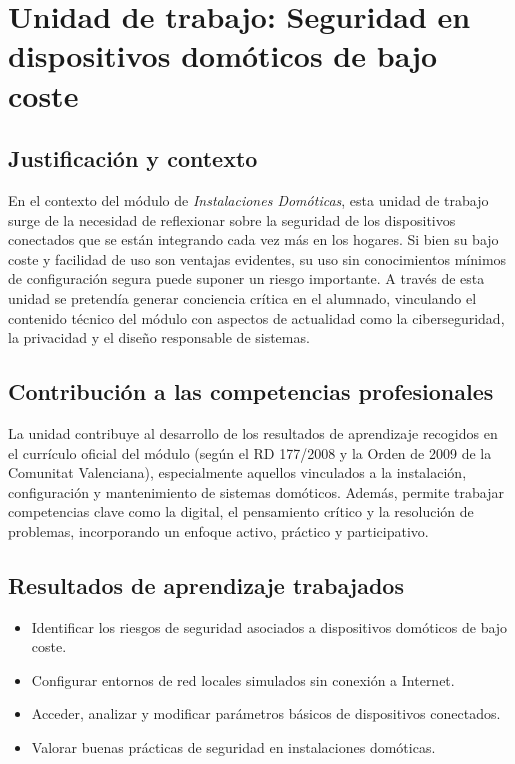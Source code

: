 \chapter{Unidad de trabajo: Seguridad en dispositivos domóticos de bajo coste}

\section*{Justificación y contexto}

En el contexto del módulo de \textit{Instalaciones Domóticas}, esta unidad de trabajo surge de la necesidad de reflexionar sobre la seguridad de los dispositivos conectados que se están integrando cada vez más en los hogares. Si bien su bajo coste y facilidad de uso son ventajas evidentes, su uso sin conocimientos mínimos de configuración segura puede suponer un riesgo importante. A través de esta unidad se pretendía generar conciencia crítica en el alumnado, vinculando el contenido técnico del módulo con aspectos de actualidad como la ciberseguridad, la privacidad y el diseño responsable de sistemas.

\section*{Contribución a las competencias profesionales}

La unidad contribuye al desarrollo de los resultados de aprendizaje recogidos en el currículo oficial del módulo (según el RD 177/2008 y la Orden de 2009 de la Comunitat Valenciana), especialmente aquellos vinculados a la instalación, configuración y mantenimiento de sistemas domóticos. Además, permite trabajar competencias clave como la digital, el pensamiento crítico y la resolución de problemas, incorporando un enfoque activo, práctico y participativo.

\section*{Resultados de aprendizaje trabajados}

\begin{itemize}
  \item Identificar los riesgos de seguridad asociados a dispositivos domóticos de bajo coste.
  \item Configurar entornos de red locales simulados sin conexión a Internet.
  \item Acceder, analizar y modificar parámetros básicos de dispositivos conectados.
  \item Valorar buenas prácticas de seguridad en instalaciones domóticas.
\end{itemize}

